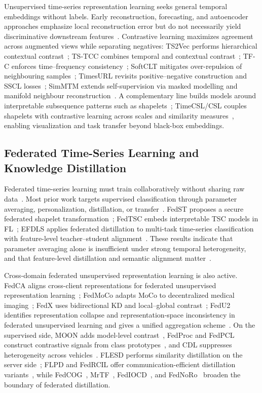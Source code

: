 \documentclass[sigconf]{acmart}
\begin{document}
Unsupervised time-series representation learning seeks general temporal
embeddings without labels. Early reconstruction, forecasting, and autoencoder
approaches emphasize local reconstruction error but do not necessarily yield
discriminative downstream features~\cite{simmtm}. Contrastive learning maximizes
agreement across augmented views while separating negatives: TS2Vec performs
hierarchical contextual contrast~\cite{ts2vec}; TS-TCC combines temporal and
contextual contrast~\cite{tstcc}; TF-C enforces time--frequency
consistency~\cite{tfc}; SoftCLT mitigates over-repulsion of neighbouring
samples~\cite{softclt}; TimesURL revisits positive--negative construction and
SSCL losses~\cite{timesurl}; SimMTM extends self-supervision via masked
modelling and manifold neighbour reconstruction~\cite{simmtm}. A complementary
line builds models around interpretable subsequence patterns such as
shapelets~\cite{interpgn,unishape}; TimeCSL/CSL couples shapelets with
contrastive learning across scales and similarity
measures~\cite{timescsl}, enabling visualization and task transfer beyond
black-box embeddings.

\subsection{Federated Time-Series Learning and Knowledge Distillation}

Federated time-series learning must train collaboratively without sharing raw
data~\cite{fedavg}. Most prior work targets supervised classification through
parameter averaging, personalization, distillation, or transfer~\cite{fedkdsurvey}.
FedST proposes a secure federated shapelet
transformation~\cite{fedst}; FedTSC embeds interpretable TSC models in
FL~\cite{fedtsc}; EFDLS applies federated distillation to multi-task time-series
classification with feature-level teacher--student alignment~\cite{efdls}.
These results indicate that parameter averaging alone is insufficient under
strong temporal heterogeneity, and that feature-level distillation and semantic
alignment matter~\cite{moon,fedx}.

Cross-domain federated unsupervised representation learning is also active.
FedCA aligns cross-client representations for federated unsupervised
representation learning~\cite{fedca}; FedMoCo adapts MoCo to decentralized
medical imaging~\cite{fedmoco}; FedX uses bidirectional KD and local--global
contrast~\cite{fedx}; FedU2 identifies representation collapse and
representation-space inconsistency in federated unsupervised learning and gives
a unified aggregation scheme~\cite{fedu2}. On the supervised side, MOON adds
model-level contrast~\cite{moon}, FedProc and FedPCL construct contrastive
signals from class prototypes~\cite{fedproc,fedpcl}, and CDL suppresses
heterogeneity across vehicles~\cite{fedcdl}. FLESD performs similarity
distillation on the server side~\cite{flesd}; FLPD and FedRCIL offer
communication-efficient distillation variants~\cite{flpd,fedrcil}, while
FedCOG~\cite{fedcog}, MrTF~\cite{mrtf}, FedIOCD~\cite{fediocd}, and
FedNoRo~\cite{fednoro} broaden the boundary of federated distillation.
\end{document}
